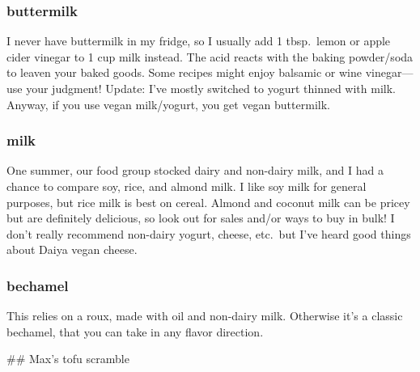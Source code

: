 \subsubsection{buttermilk}
I never have buttermilk in my fridge, so I usually add 1 tbsp.\ lemon or apple cider vinegar to 1 cup milk instead. The acid reacts with the baking powder/soda to leaven your baked goods. Some recipes might enjoy balsamic or wine vinegar---use your judgment! Update: I've mostly switched to yogurt thinned with milk. Anyway, if you use vegan milk/yogurt, you get vegan buttermilk.

\subsubsection{milk}
One summer, our food group stocked dairy and non-dairy milk, and I had a chance to compare soy, rice, and almond milk. I like soy milk for general purposes, but rice milk is best on cereal. Almond and coconut milk can be pricey but are definitely delicious, so look out for sales and/or ways to buy in bulk! I don't really recommend non-dairy yogurt, cheese, etc.\ but I've heard good things about Daiya vegan cheese.

\subsubsection{bechamel}
This relies on a roux, made with oil and non-dairy milk. Otherwise it's a classic bechamel, that you can take in any flavor direction.

## Max's tofu scramble

